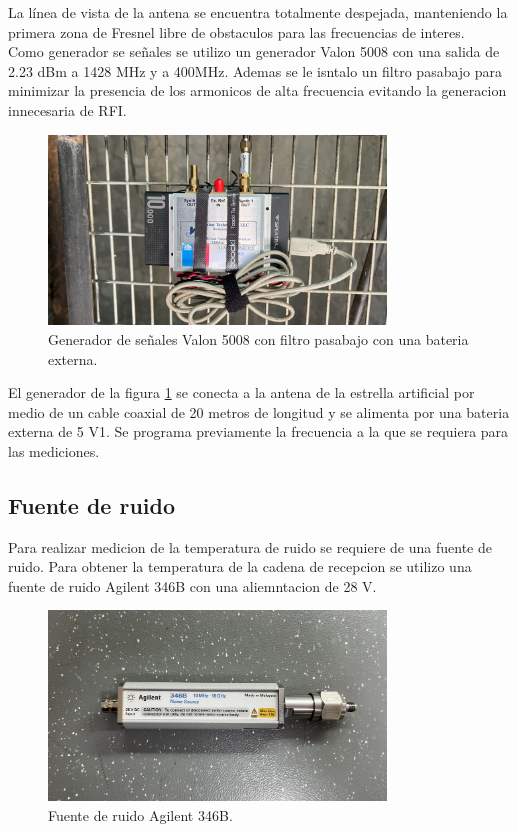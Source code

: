 La línea de vista de la antena se encuentra totalmente despejada, manteniendo la primera zona de Fresnel libre de obstaculos para las frecuencias de interes.\\

Como generador se señales se utilizo un generador Valon 5008 con una salida de 2.23 dBm a 1428 MHz y a 400MHz. Ademas se le isntalo un filtro pasabajo para minimizar la presencia de los armonicos de alta frecuencia evitando la generacion innecesaria de RFI.\\

\begin{figure}
    \centering
    \includegraphics[width=0.8\textwidth]{img/valon}
    \caption{Generador de señales Valon 5008 con filtro pasabajo con una bateria externa.}
    \label{fig:generador}
\end{figure}

El generador de la figura \ref{fig:generador} se conecta a la antena de la estrella artificial por medio de un cable coaxial de 20 metros de longitud y se alimenta por una bateria externa de 5 V1. Se programa previamente la frecuencia a la que se requiera para las mediciones.\\

\subsection{Fuente de ruido}

Para realizar medicion de la temperatura de ruido se requiere de una fuente de ruido. Para obtener la temperatura de la cadena de recepcion se utilizo una fuente de ruido Agilent 346B con una aliemntacion de 28 V.\\

\begin{figure}
    \centering
    \includegraphics[width=0.8\textwidth]{img/fuenteRuido}
    \caption{Fuente de ruido Agilent 346B.}
    \label{fig:fuente_ruido}
\end{figure}


